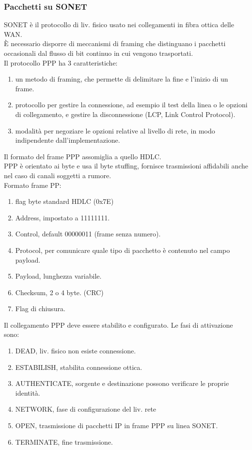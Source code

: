 \documentclass{article}
\begin{document}
\subsubsection{Pacchetti su SONET}
SONET è il protocollo di liv. fisico usato nei collegamenti in fibra ottica delle WAN.\\
È necessario disporre di meccanismi di framing che distinguano i pacchetti occasionali dal flusso di bit continuo in cui vengono trasportati. \\
Il protocollo PPP ha 3 caratteristiche:
\begin{enumerate}
\item un metodo di framing, che permette di delimitare la fine e l'inizio di un frame.
\item protocollo per gestire la connessione, ad esempio il test della linea o le opzioni di collegamento, e gestire la disconnessione (LCP, Link Control Protocol).
\item modalità per negoziare le opzioni relative al livello di rete, in modo indipendente dall'implementazione. \\
\end{enumerate}
Il formato del frame PPP assomiglia a quello HDLC.\\
PPP è orientato ai byte e usa il byte stuffing, fornisce trasmissioni affidabili anche nel caso di canali soggetti a rumore. \\
Formato frame PP:
\begin{enumerate}
\item flag byte standard HDLC (0x7E)
\item Address, impostato a 11111111.
\item Control, default 00000011 (frame senza numero).
\item Protocol, per comunicare quale tipo di pacchetto è contenuto nel campo payload. 
\item Payload, lunghezza  variabile.
\item Checksum, 2 o 4 byte. (CRC)
\item Flag di chiusura.
\end{enumerate}
Il collegamento PPP deve essere stabilito e configurato. Le fasi di attivazione sono:
\begin{enumerate}
\item DEAD, liv. fisico non esiste connessione.
\item ESTABILISH, stabilita connessione ottica.
\item AUTHENTICATE, sorgente e destinazione possono verificare le proprie identità.
\item NETWORK, fase di configurazione del liv. rete
\item OPEN, trasmissione di pacchetti IP in frame PPP su linea SONET. 
\item TERMINATE, fine trasmissione.
\end{enumerate}
\end{document}
